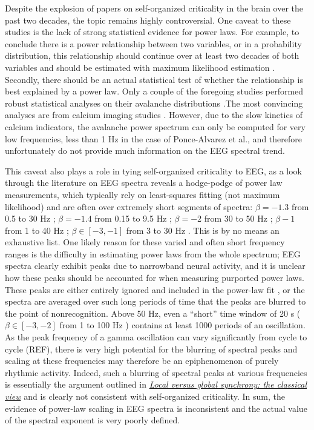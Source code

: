 Despite the explosion of papers on self-organized criticality in the brain over the past two decades, the topic remains highly controversial. One caveat to these studies is the lack of strong statistical evidence for power laws. For example, to conclude there is a power relationship between two variables, or in a probability distribution, this relationship should continue over at least two decades of both variables and should be estimated with maximum likelihood estimation \cite{Stumpf2012}. Secondly, there should be an actual statistical test of whether the relationship is best explained by a power law. Only a couple of the foregoing studies performed robust statistical analyses on their avalanche distributions \cite{Clauset2009}.The most convincing analyses are from calcium imaging studies \cite{Bellay2015, Ponce-Alvarez2018}. However, due to the slow kinetics of calcium indicators, the avalanche power spectrum can only be computed for very low frequencies, less than 1 Hz in the case of Ponce-Alvarez et al.\cite{Ponce-Alvarez2018}, and therefore unfortunately do not provide much information on the EEG spectral trend. 

This caveat also plays a role in tying self-organized criticality to EEG, as a look through the literature on EEG spectra reveals a hodge-podge of power law measurements, which typically rely on least-squares fitting (not maximum likelihood) and are often over extremely short segments of spectra: $\beta=-1.3$ from 0.5 to 30 Hz \cite{Pritchard1992}; $\beta=-1.4$ from 0.15 to 9.5 Hz \cite{Dehghani2010}; $\beta=-2$ from 30 to 50 Hz \cite{Lendner2020}; $\beta -1$ from 1 to 40 Hz \cite{Colombo2019}; $\beta\in[-3,-1]$ from 3 to 30 Hz \cite{Pereda1998}. This is by no means an exhaustive list. One likely reason for these varied and often short frequency ranges is the difficulty in estimating power laws from the whole spectrum; EEG spectra clearly exhibit peaks due to narrowband neural activity, and it is unclear how these peaks should be accounted for when measuring purported power laws. These peaks are either entirely ignored and included in the power-law fit \cite{Pritchard1992}, or the spectra are averaged over such long periods of time that the peaks are blurred to the point of nonrecognition. Above 50 Hz, even a “short” time window of 20 s ($\beta\in[-3,-2]$ from 1 to 100 Hz \cite{He2010}) contains at least 1000 periods of an oscillation. As the peak frequency of a gamma oscillation can vary significantly from cycle to cycle (REF), there is very high potential for the blurring of spectral peaks and scaling at these frequencies may therefore be an epiphenomenon of purely rhythmic activity. Indeed, such a blurring of spectral peaks at various frequencies is essentially the argument outlined in \hyperref[sec:branching_prcoess]{\textit{Local versus global synchrony: the classical view}} and is clearly not consistent with self-organized criticality. In sum, the evidence of power-law scaling in EEG spectra is inconsistent and the actual value of the spectral exponent is very poorly defined. 

